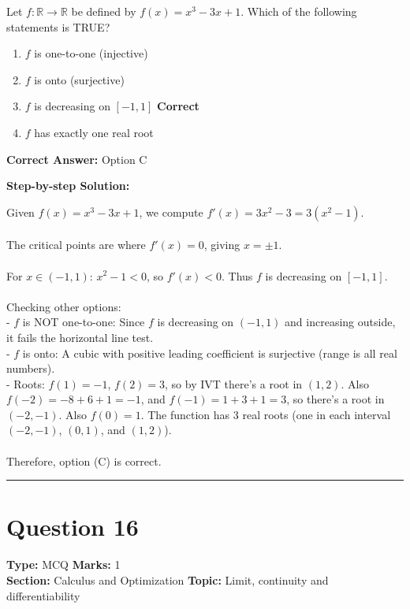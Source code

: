 \documentclass[11pt]{article}
\begin{document}
Let \(f: \mathbb{R} \to \mathbb{R}\) be defined by \(f(x) = x^3 - 3x + 1\). Which of the following statements is TRUE?


\begin{enumerate}[label=\textbf{\Alph*.}, leftmargin=1.8em]
\item \(f\) is one-to-one (injective)\item \(f\) is onto (surjective)\item \(f\) is decreasing on \([-1, 1]\) \hfill {\color{gategreen}\textbf{Correct}}\item \(f\) has exactly one real root\end{enumerate}

\textbf{Correct Answer:} Option C

\textbf{Step-by-step Solution:}

Given \(f(x) = x^3 - 3x + 1\), we compute \(f'(x) = 3x^2 - 3 = 3(x^2 - 1)\).\\
\\
The critical points are where \(f'(x) = 0\), giving \(x = \pm 1\).\\
\\
For \(x \in (-1, 1)\): \(x^2 - 1 < 0\), so \(f'(x) < 0\). Thus \(f\) is decreasing on \([-1, 1]\).\\
\\
Checking other options:\\
- \(f\) is NOT one-to-one: Since \(f\) is decreasing on \((-1, 1)\) and increasing outside, it fails the horizontal line test.\\
- \(f\) is onto: A cubic with positive leading coefficient is surjective (range is all real numbers).\\
- Roots: \(f(1) = -1\), \(f(2) = 3\), so by IVT there's a root in \((1, 2)\). Also \(f(-2) = -8 + 6 + 1 = -1\), and \(f(-1) = 1 + 3 + 1 = 3\), so there's a root in \((-2, -1)\). Also \(f(0) = 1\). The function has 3 real roots (one in each interval \((-2, -1)\), \((0, 1)\), and \((1, 2)\)).\\
\\
Therefore, option (C) is correct.

\vspace{0.8em}
\hrule
\vspace{0.4em}
\section*{Question 16}
\textbf{Type:} MCQ \hfill \textbf{Marks:} 1\\
\textbf{Section:} Calculus and Optimization \hfill \textbf{Topic:} Limit, continuity and differentiability
\end{document}
